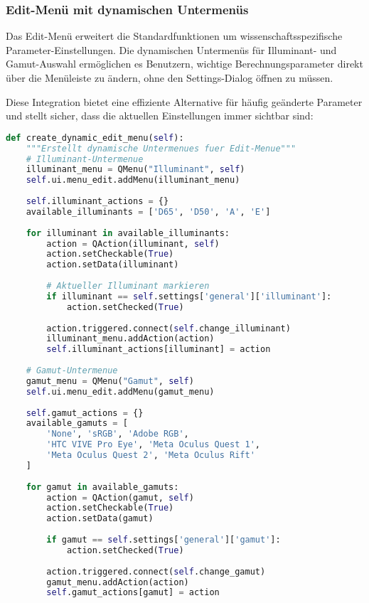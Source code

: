 \subsubsection{Edit-Menü mit dynamischen Untermenüs}

Das Edit-Menü erweitert die Standardfunktionen um wissenschaftsspezifische Parameter-Einstellungen. Die dynamischen Untermenüs für Illuminant- und Gamut-Auswahl ermöglichen es Benutzern, wichtige Berechnungsparameter direkt über die Menüleiste zu ändern, ohne den Settings-Dialog öffnen zu müssen.

Diese Integration bietet eine effiziente Alternative für häufig geänderte Parameter und stellt sicher, dass die aktuellen Einstellungen immer sichtbar sind:

\begin{lstlisting}[language=Python, caption=Dynamische Edit-Menü Erstellung]
def create_dynamic_edit_menu(self):
    """Erstellt dynamische Untermenues fuer Edit-Menue"""
    # Illuminant-Untermenue
    illuminant_menu = QMenu("Illuminant", self)
    self.ui.menu_edit.addMenu(illuminant_menu)
    
    self.illuminant_actions = {}
    available_illuminants = ['D65', 'D50', 'A', 'E']
    
    for illuminant in available_illuminants:
        action = QAction(illuminant, self)
        action.setCheckable(True)
        action.setData(illuminant)
        
        # Aktueller Illuminant markieren
        if illuminant == self.settings['general']['illuminant']:
            action.setChecked(True)
        
        action.triggered.connect(self.change_illuminant)
        illuminant_menu.addAction(action)
        self.illuminant_actions[illuminant] = action
    
    # Gamut-Untermenue
    gamut_menu = QMenu("Gamut", self)
    self.ui.menu_edit.addMenu(gamut_menu)
    
    self.gamut_actions = {}
    available_gamuts = [
        'None', 'sRGB', 'Adobe RGB', 
        'HTC VIVE Pro Eye', 'Meta Oculus Quest 1', 
        'Meta Oculus Quest 2', 'Meta Oculus Rift'
    ]
    
    for gamut in available_gamuts:
        action = QAction(gamut, self)
        action.setCheckable(True)
        action.setData(gamut)
        
        if gamut == self.settings['general']['gamut']:
            action.setChecked(True)
        
        action.triggered.connect(self.change_gamut)
        gamut_menu.addAction(action)
        self.gamut_actions[gamut] = action
\end{lstlisting}

